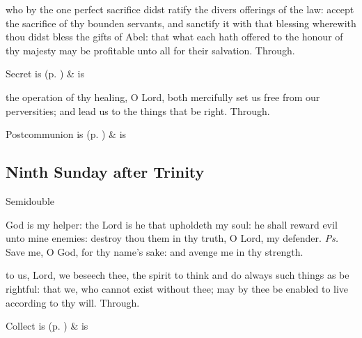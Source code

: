 
\secret
{} who by the one perfect sacrifice didst ratify the divers offerings of the law: accept the sacrifice of thy bounden servants, and sanctify it with that blessing wherewith thou didst bless the gifts of Abel: that what each hath offered to the honour of thy majesty may be profitable unto all for their salvation. Through.
\begin{rubric}
     Secret is  (p. \pageref{SPSaints}) \&  is 
\end{rubric}


\postcommunion
{} the operation of thy healing, O Lord, both mercifully set us free from our perversities; and lead us to the things that be right. Through.


\begin{rubric}
     Postcommunion is  (p. \pageref{SPSaints}) \&  is 
\end{rubric}


\clearpage
\subsection{Ninth Sunday after Trinity}
\begin{inhead}
{Semidouble}
\end{inhead}


\vspace{-0.75\baselineskip}

\introit
{} God is my helper: the Lord is he that upholdeth my soul: he shall reward evil unto mine enemies: destroy thou them in thy truth, O Lord, my defender. \textit{Ps.} Save me, O God, for thy name's sake: and avenge me in thy strength.

\vspace{-1\baselineskip}

\collect
{} to us, Lord, we beseech thee, the spirit to think and do always such things as be rightful: that we, who cannot exist without thee; may by thee be enabled to live according to thy will. Through.
\begin{rubric}
     Collect is  (p. \pageref{SPSaints}) \&  is 
\end{rubric}

